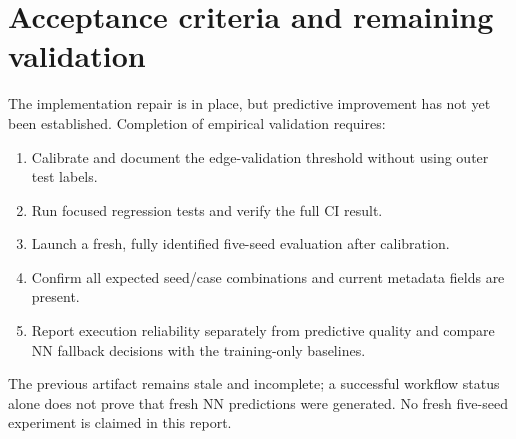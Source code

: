 \documentclass[11pt,a4paper]{article}
\begin{document}
\section{Acceptance criteria and remaining validation}
The implementation repair is in place, but predictive improvement has not yet been established. Completion of empirical validation requires:
\begin{enumerate}[leftmargin=*]
\item Calibrate and document the edge-validation threshold without using outer test labels.
\item Run focused regression tests and verify the full CI result.
\item Launch a fresh, fully identified five-seed evaluation after calibration.
\item Confirm all expected seed/case combinations and current metadata fields are present.
\item Report execution reliability separately from predictive quality and compare NN fallback decisions with the training-only baselines.
\end{enumerate}

The previous artifact remains stale and incomplete; a successful workflow status alone does not prove that fresh NN predictions were generated. No fresh five-seed experiment is claimed in this report.
\end{document}
